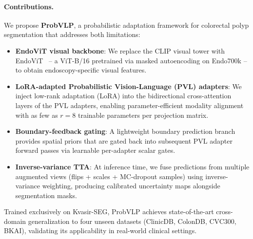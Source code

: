 \paragraph{Contributions.}
We propose \textbf{ProbVLP}, a probabilistic adaptation framework for colorectal
polyp segmentation that addresses both limitations:
\begin{itemize}
    \item \textbf{EndoViT visual backbone}: We replace the CLIP visual tower with
          EndoViT~\cite{} -- a ViT-B/16 pretrained via masked autoencoding on
          Endo700k -- to obtain endoscopy-specific visual features.
    \item \textbf{LoRA-adapted Probabilistic Vision-Language (PVL) adapters}: We
          inject low-rank adaptation (LoRA) into the bidirectional cross-attention
          layers of the PVL adapters, enabling parameter-efficient modality alignment
          with as few as $r{=}8$ trainable parameters per projection matrix.
    \item \textbf{Boundary-feedback gating}: A lightweight boundary prediction
          branch provides spatial priors that are gated back into subsequent PVL
          adapter forward passes via learnable per-adapter scalar gates.
    \item \textbf{Inverse-variance TTA}: At inference time, we fuse predictions
          from multiple augmented views (flips + scales + MC-dropout samples) using
          inverse-variance weighting, producing calibrated uncertainty maps alongside
          segmentation masks.
\end{itemize}

Trained exclusively on Kvasir-SEG, ProbVLP achieves state-of-the-art cross-domain
generalization to four unseen datasets (ClinicDB, ColonDB, CVC300, BKAI), validating
its applicability in real-world clinical settings.
